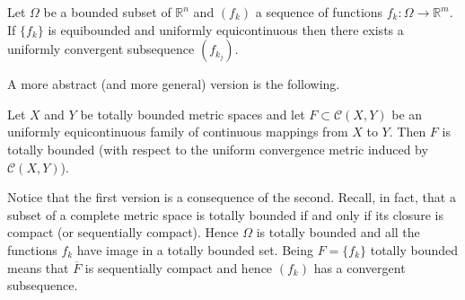 \documentclass[12pt]{article}
\newcommand{\R}{\mathbb R}
\begin{document}
Let $\Omega$ be a bounded subset of $\R^n$ and $(f_k)$ a sequence of functions $f_k\colon \Omega\to \R^m$. If $\{f_k\}$ is equibounded and uniformly equicontinuous then there exists a uniformly convergent subsequence $(f_{k_j})$.

A more abstract (and more general) version is the following.

Let $X$ and $Y$ be totally bounded metric spaces and let $F\subset \mathcal C(X,Y)$ be an uniformly equicontinuous family of continuous mappings from $X$ to $Y$. 
Then $F$ is totally bounded (with respect to the uniform convergence metric induced by $\mathcal C (X,Y)$).

Notice that the first version is a consequence of the second. 
Recall, in fact, that a subset of a complete metric space is totally bounded if and only if its closure is compact (or sequentially compact).
Hence $\Omega$ is totally bounded and all the functions $f_k$ have image in a totally bounded set. Being $F=\{f_k\}$ totally bounded means that $\overline F$ is sequentially compact and hence $(f_k)$ has a convergent subsequence.
\end{document}
